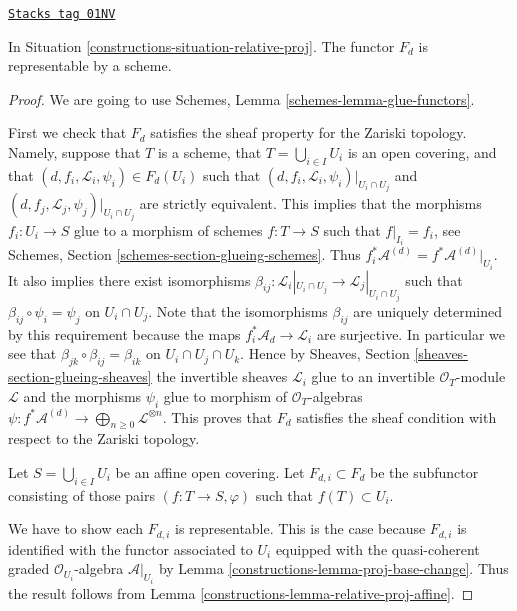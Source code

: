 \begin{lemma}
\label{constructions-lemma-relative-proj-d}
\href{https://stacks.math.columbia.edu/tag/01NV}{\texttt{Stacks tag 01NV}}

In Situation \ref{constructions-situation-relative-proj}.
The functor $F_d$ is representable by a scheme.
\end{lemma}

\begin{proof}

We are going to use Schemes, Lemma \ref{schemes-lemma-glue-functors}.

\medskip\noindent
First we check that $F_d$ satisfies the sheaf property for the
Zariski topology. Namely, suppose that $T$ is a scheme,
that $T = \bigcup_{i \in I} U_i$ is an open covering,
and that $(d, f_i, \mathcal{L}_i, \psi_i) \in F_d(U_i)$ such that
$(d, f_i, \mathcal{L}_i, \psi_i)|_{U_i \cap U_j}$ and
$(d, f_j, \mathcal{L}_j, \psi_j)|_{U_i \cap U_j}$ are strictly
equivalent. This implies that the morphisms $f_i : U_i \to S$
glue to a morphism of schemes $f : T \to S$ such that
$f|_{I_i} = f_i$, see Schemes, Section \ref{schemes-section-glueing-schemes}.
Thus $f_i^*\mathcal{A}^{(d)} = f^*\mathcal{A}^{(d)}|_{U_i}$.
It also implies there exist isomorphisms
$\beta_{ij} : \mathcal{L}_i|_{U_i \cap U_j} \to \mathcal{L}_j|_{U_i \cap U_j}$
such that $\beta_{ij} \circ \psi_i = \psi_j$ on $U_i \cap U_j$.
Note that the isomorphisms $\beta_{ij}$ are uniquely determined
by this requirement because the maps $f_i^*\mathcal{A}_d \to \mathcal{L}_i$
are surjective. In particular we see that
$\beta_{jk} \circ \beta_{ij} = \beta_{ik}$ on $U_i \cap U_j \cap U_k$.
Hence by Sheaves,
Section \ref{sheaves-section-glueing-sheaves} the invertible sheaves
$\mathcal{L}_i$ glue to an invertible $\mathcal{O}_T$-module
$\mathcal{L}$ and the morphisms $\psi_i$ glue to
morphism of $\mathcal{O}_T$-algebras
$\psi : f^*\mathcal{A}^{(d)} \to \bigoplus_{n \geq 0} \mathcal{L}^{\otimes n}$.
This proves that $F_d$ satisfies the sheaf condition with respect to
the Zariski topology.

\medskip\noindent
Let $S = \bigcup_{i \in I} U_i$ be an affine open covering.
Let $F_{d, i} \subset F_d$ be the subfunctor consisting of
those pairs $(f : T \to S, \varphi)$ such that
$f(T) \subset U_i$.

\medskip\noindent
We have to show each $F_{d, i}$ is representable.
This is the case because $F_{d, i}$ is identified with
the functor associated to $U_i$ equipped with
the quasi-coherent graded $\mathcal{O}_{U_i}$-algebra
$\mathcal{A}|_{U_i}$ by Lemma \ref{constructions-lemma-proj-base-change}.
Thus the result follows from Lemma \ref{constructions-lemma-relative-proj-affine}.


\end{proof}
